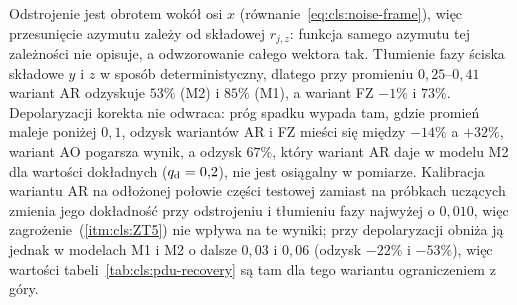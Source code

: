 Odstrojenie jest obrotem wokół osi $x$ (równanie~\eqref{eq:cls:noise-frame}), więc przesunięcie azymutu zależy od składowej $r_{j,z}$: funkcja samego azymutu tej zależności nie opisuje, a odwzorowanie całego wektora tak.
Tłumienie fazy ściska składowe $y$ i $z$ w sposób deterministyczny, dlatego przy promieniu $0{,}25$--$0{,}41$ wariant AR odzyskuje $53\%$ (M2) i $85\%$ (M1), a wariant FZ $-1\%$ i $73\%$.
Depolaryzacji korekta nie odwraca: próg spadku wypada tam, gdzie promień maleje poniżej $0{,}1$, odzysk wariantów AR i FZ mieści się między $-14\%$ a $+32\%$, wariant AO pogarsza wynik, a odzysk $67\%$, który wariant AR daje w modelu M2 dla wartości dokładnych ($q_{\mathrm{d}}=0{,}2$), nie jest osiągalny w pomiarze.
Kalibracja wariantu AR na odłożonej połowie części testowej zamiast na próbkach uczących zmienia jego dokładność przy odstrojeniu i tłumieniu fazy najwyżej o $0{,}010$, więc zagrożenie~(\ref{itm:cls:ZT5}) nie wpływa na te wyniki; przy depolaryzacji obniża ją jednak w modelach M1 i M2 o dalsze $0{,}03$ i $0{,}06$ (odzysk $-22\%$ i $-53\%$), więc wartości tabeli~\ref{tab:cls:pdu-recovery} są tam dla tego wariantu ograniczeniem z góry.
